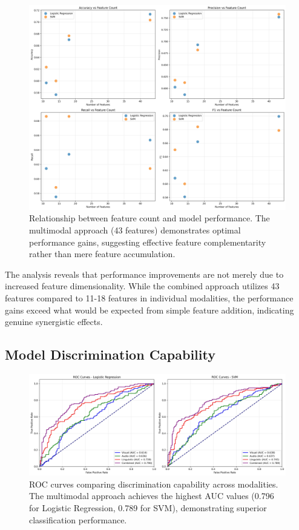 \begin{figure}[H]
    \centering
    \includegraphics[width=\textwidth]{sections/feature_count_vs_performance.jpg}
    \caption{Relationship between feature count and model performance. The multimodal approach (43 features) demonstrates optimal performance gains, suggesting effective feature complementarity rather than mere feature accumulation.}
    \label{fig:feature_scaling}
\end{figure}

The analysis reveals that performance improvements are not merely due to increased feature dimensionality. While the combined approach utilizes 43 features compared to 11-18 features in individual modalities, the performance gains exceed what would be expected from simple feature addition, indicating genuine synergistic effects.

\subsection{Model Discrimination Capability}

\begin{figure}[H]
    \centering
    \includegraphics[width=\textwidth]{sections/roc_curves.jpg}
    \caption{ROC curves comparing discrimination capability across modalities. The multimodal approach achieves the highest AUC values (0.796 for Logistic Regression, 0.789 for SVM), demonstrating superior classification performance.}
    \label{fig:roc_curves}
\end{figure}

